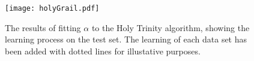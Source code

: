 \begin{figure}[H]
    \begin{center}
        \texttt{[image: holyGrail.pdf]}
        \caption[Holy Trinity]{The results of fitting $\alpha{}$ to the Holy Trinity algorithm, showing the learning process on the test set. The learning of each data set has been added with dotted lines for illustative purposes.}
        \label{fig:holyTrinity}
    \end{center}
\end{figure}

